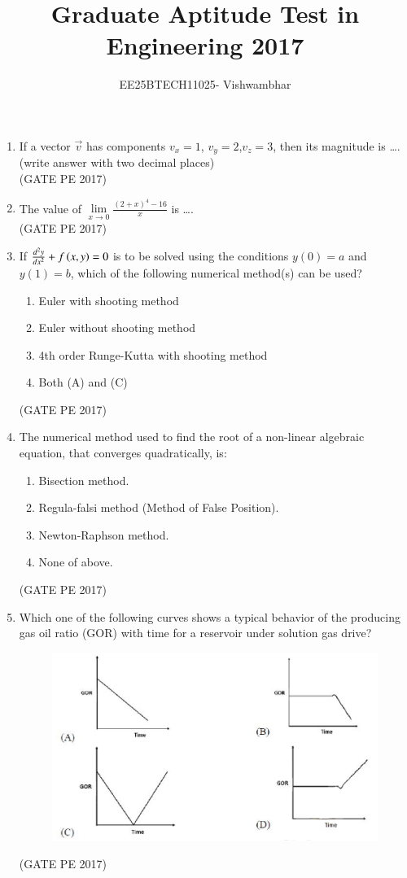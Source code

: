 \documentclass[journal,12pt,onecolumn]{IEEEtran}
\title{Graduate Aptitude Test in Engineering 2017}
\author{EE25BTECH11025- Vishwambhar}
\theoremstyle{remark}
\begin{document}
\maketitle

\begin{enumerate}
 
\item If a vector $\vec{v}$ has components $v_x = 1$, $v_y = 2$,$v_z = 3$, then its magnitude is \dots.\\
(write answer with two decimal places)\\

\hfill{(GATE PE 2017)}

\item The value of $\lim\limits_{x \to 0} \frac{(2 + x)^4 - 16}{x} $ is \dots.\\

\hfill{(GATE PE 2017)}

\item If $\frac{d^2 y}{dx^2} + f\left(x, y\right) = 0$ is to be solved using the conditions $y(0) = a$ and $y(1) = b$, which of the following numerical method(s) can be used?
\begin{enumerate}
\item Euler with shooting method
\item Euler without shooting method
\item 4th order Runge-Kutta with shooting method
\item Both (A) and (C)
\end{enumerate}
\hfill{(GATE PE 2017)}

\item The numerical method used to find the root of a non-linear algebraic equation, that converges quadratically, is:
\begin{enumerate}
\item Bisection method.
\item Regula-falsi method (Method of False Position).
\item Newton-Raphson method.
\item None of above.
\end{enumerate}
\hfill{(GATE PE 2017)}

\item Which one of the following curves shows a typical behavior of the producing gas oil ratio (GOR) with time for a reservoir under solution gas drive?
\begin{figure}[h]
    \centering
    \includegraphics[width=0.5\columnwidth]{GraphQ _5.png}
\end{figure}
\hfill{(GATE PE 2017)}


\end{enumerate}
\end{document}
